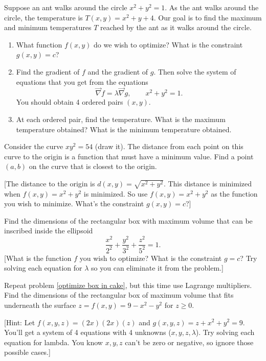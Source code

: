 \begin{problem}
 Suppose an ant walks around the circle $x^2+y^2=1$.  As the ant walks around the circle, the temperature is $T(x,y) = x^2+y+4$.  Our goal is to find the maximum and minimum temperatures $T$ reached by the ant as it walks around the circle. 
 \begin{enumerate}
  \item What function $f(x,y)$ do we wish to optimize? What is the constraint $g(x,y)=c$?
  \item {}%
Find the gradient of $f$ and the gradient of $g$.  Then solve the system of equations that you get from the equations $$\vec \nabla f = \lambda \vec \nabla g, \quad \quad x^2+y^2=1.$$ 
  You should obtain 4 ordered pairs $(x,y)$.
  \item At each ordered pair, find the temperature.  What is the maximum temperature obtained? What is the minimum temperature obtained.
 \end{enumerate}
\end{problem}

\begin{problem}
 Consider the curve $xy^2=54$ (draw it). The distance from each point on this curve to the origin is a function that must have a minimum value. Find a point $(a,b)$ on the curve that is closest to the origin.  

[The distance to the origin is $d(x,y)=\sqrt{x^2+y^2}.$ This distance is minimized when $f(x,y) = x^2+y^2$ is minimized. So use $f(x,y)=x^2+y^2$ as the function you wish to minimize. What's the constraint $g(x,y)=c$?]
\end{problem}

\begin{problem}
 Find the dimensions of the rectangular box with maximum volume that can be inscribed inside the ellipsoid $$\frac{x^2}{2^2}+\frac{y^2}{3^2}+\frac{z^2}{5^2}=1.$$
[What is the function $f$ you wish to optimize? What is the constraint $g=c$? Try solving each equation for $\lambda$ so you can eliminate it from the problem.]
\end{problem}

\begin{problem}
Repeat problem \ref{optimize box in cake}, but this time use Lagrange multipliers.
Find the dimensions of the rectangular box of maximum volume that fits underneath the surface $z=f(x,y)=9-x^2-y^2$ for $z\geq 0$. 

[Hint: Let $f(x,y,z) = (2x)(2x)(z)$ and $g(x,y,z)=z+x^2+y^2=9$. You'll get a system of 4 equations with 4 unknowns ($x,y,z,\lambda$).  Try solving each equation for lambda. You know $x,y,z$ can't be zero or negative, so ignore those possible cases.]
\end{problem}

